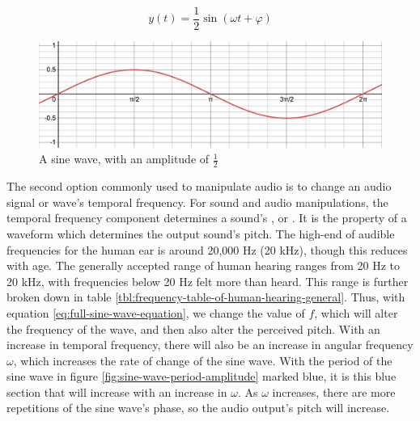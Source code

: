 \begin{equation}\label{eq:half-sized-sine-wave}
	y(t) = \frac{1}{2} \sin(\omega t + \varphi)
\end{equation}

\begin{figure}
	\centering
	\includegraphics[width=\textwidth]{figures/half-sized-sine-wave.png}
	\caption{A sine wave, with an amplitude of $\frac{1}{2}$}
	\label{fig:half-sized-sine-wave}
\end{figure}

The second option commonly used to manipulate audio is to change an audio signal or wave's temporal frequency. For sound and audio manipulations, the temporal frequency component determines a sound's , or . It is the property of a waveform which determines the output sound's pitch. The high-end of audible frequencies for the human ear is around 20,000 Hz (20 kHz), though this reduces with age. The generally accepted range of human hearing ranges from 20 Hz to 20 kHz, with frequencies below 20 Hz felt more than heard\cite{Rosen_Howell_2011}. This range is further broken down in table \ref{tbl:frequency-table-of-human-hearing-general}. Thus, with equation \ref{eq:full-sine-wave-equation}, we change the value of $f$, which will alter the frequency of the wave, and then also alter the perceived pitch. With an increase in temporal frequency, there will also be an increase in angular frequency $\omega$, which increases the rate of change of the sine wave. With the period of the sine wave in figure \ref{fig:sine-wave-period-amplitude} marked blue, it is this blue section that will increase with an increase in $\omega$. As $\omega$ increases, there are more repetitions of the sine wave's phase, so the audio output's pitch will increase.


